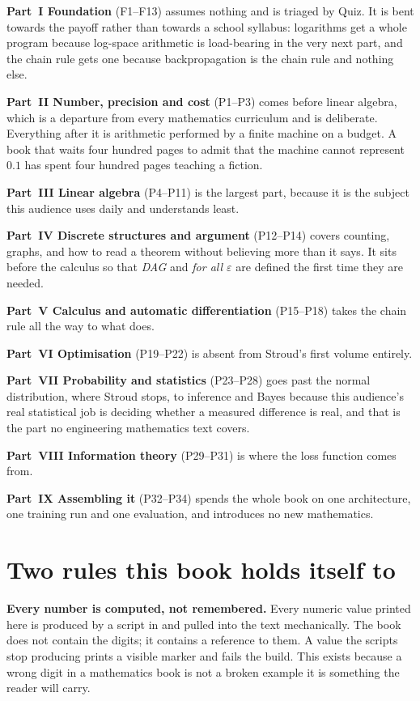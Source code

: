 \textbf{Part~I \dash{} Foundation} (F1--F13) assumes nothing and is triaged by
Quiz. It is bent towards the payoff rather than towards a school syllabus:
logarithms get a whole program because log-space arithmetic is load-bearing
in the very next part, and the chain rule gets one because backpropagation is
the chain rule and nothing else.

\textbf{Part~II \dash{} Number, precision and cost} (P1--P3) comes before linear
algebra, which is a departure from every mathematics curriculum and is
deliberate. Everything after it is arithmetic performed by a finite machine on
a budget. A book that waits four hundred pages to admit that the machine cannot
represent $\num{0.1}$ has spent four hundred pages teaching a fiction.

\textbf{Part~III \dash{} Linear algebra} (P4--P11) is the largest part, because it
is the subject this audience uses daily and understands least.

\textbf{Part~IV \dash{} Discrete structures and argument} (P12--P14) covers
counting, graphs, and how to read a theorem without believing more than it
says. It sits before the calculus so that \emph{DAG} and \emph{for all
$\varepsilon$} are defined the first time they are needed.

\textbf{Part~V \dash{} Calculus and automatic differentiation} (P15--P18) takes the
chain rule all the way to what  does.

\textbf{Part~VI \dash{} Optimisation} (P19--P22) is absent from Stroud's first
volume entirely.

\textbf{Part~VII \dash{} Probability and statistics} (P23--P28) goes past the
normal distribution, where Stroud stops, to inference and Bayes \dash{} because
this audience's real statistical job is deciding whether a measured difference
is real, and that is the part no engineering mathematics text covers.

\textbf{Part~VIII \dash{} Information theory} (P29--P31) is where the loss function
comes from.

\textbf{Part~IX \dash{} Assembling it} (P32--P34) spends the whole book on one
architecture, one training run and one evaluation, and introduces no new
mathematics.

\section*{Two rules this book holds itself to}

\begin{note}
\textbf{Every number is computed, not remembered.} Every numeric value printed
here is produced by a script in  and pulled into the text
mechanically. The book does not contain the digits; it contains a reference to
them. A value the scripts stop producing prints a visible marker and fails the
build. This exists because a wrong digit in a mathematics book is not a broken
example \dash{} it is something the reader will carry.
\end{note}


